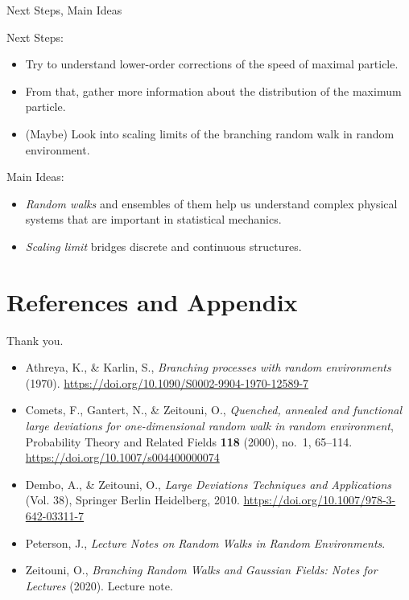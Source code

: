 \documentclass{if-beamer}
\begin{document}
\begin{frame}{Next Steps, Main Ideas}


    Next Steps:

    \begin{itemize}
        \item Try to understand lower-order corrections of the speed of maximal particle.
        \item From that, gather more information about the distribution of the maximum particle.
        \item (Maybe) Look into scaling limits of the branching random walk in random environment.
    \end{itemize}

    \pause
    Main Ideas:

    \begin{itemize}
        \item \emph{Random walks} and ensembles of them help us understand complex physical systems that are important in statistical mechanics.
        \item \emph{Scaling limit} bridges discrete and continuous structures.
    \end{itemize}
\end{frame}

\section{References and Appendix}
\begin{frame}
    \begin{center}
        \Huge Thank you.
    \end{center}
\vfill
    
\begin{itemize}
    \item Athreya, K., \& Karlin, S., \emph{Branching processes with random environments} (1970). \url{https://doi.org/10.1090/S0002-9904-1970-12589-7}

    \item Comets, F., Gantert, N., \& Zeitouni, O., \emph{Quenched, annealed and functional large deviations for one-dimensional random walk in random environment}, Probability Theory and Related Fields \textbf{118} (2000), no.~1, 65–114. \url{https://doi.org/10.1007/s004400000074}

    \item Dembo, A., \& Zeitouni, O., \emph{Large Deviations Techniques and Applications} (Vol. 38), Springer Berlin Heidelberg, 2010. \url{https://doi.org/10.1007/978-3-642-03311-7}

    \item Peterson, J., \emph{Lecture Notes on Random Walks in Random Environments}.

    \item Zeitouni, O., \emph{Branching Random Walks and Gaussian Fields: Notes for Lectures} (2020). Lecture note.

    \end{itemize}
\end{frame}
\end{document}
